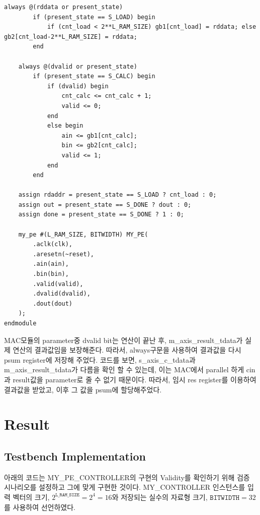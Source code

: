 \documentclass{article}
\newcommand{\orange}[1]{{\color{orange} #1}}
\begin{document}
\begin{lstlisting}[style={verilog-style}]
    always @(rddata or present_state)
        if (present_state == S_LOAD) begin
            if (cnt_load < 2**L_RAM_SIZE) gb1[cnt_load] = rddata; else gb2[cnt_load-2**L_RAM_SIZE] = rddata;
        end
    
    always @(dvalid or present_state)
        if (present_state == S_CALC) begin
            if (dvalid) begin
                cnt_calc <= cnt_calc + 1;
                valid <= 0;
            end
            else begin
                ain <= gb1[cnt_calc];
                bin <= gb2[cnt_calc];
                valid <= 1;
            end
        end
    
    assign rdaddr = present_state == S_LOAD ? cnt_load : 0;
    assign out = present_state == S_DONE ? dout : 0;
    assign done = present_state == S_DONE ? 1 : 0;
    
    my_pe #(L_RAM_SIZE, BITWIDTH) MY_PE(
        .aclk(clk),
        .aresetn(~reset),
        .ain(ain),
        .bin(bin),
        .valid(valid),
        .dvalid(dvalid),
        .dout(dout)
    );
endmodule
\end{lstlisting}

\orange{
MAC모듈의 parameter중 dvalid bit는 연산이 끝난 후, m\_axis\_result\_tdata가 실제 연산의 결과값임을 보장해준다. 따라서, always구문을 사용하여 결과값을 다시 psum register에 저장해 주었다. 코드를 보면, s\_axis\_c\_tdata과 m\_axis\_result\_tdata가 다름을 확인 할 수 있는데, 이는 MAC에서 parallel 하게 cin과 result값을 parameter로 줄 수 없기 때문이다. 따라서, 임시 res register를 이용하여 결과값을 받았고, 이후 그 값을 psum에 할당해주었다.
}

\newpage
\section{Result}

\subsection{Testbench Implementation}
\label{sec:testbench}
아래의 코드는 MY\_PE\_CONTROLLER의 구현의 Validity를 확인하기 위해 검증 시나리오를 설정하고 그에 맞게 구현한 것이다. MY\_CONTROLLER 인스턴스를 입력 벡터의 크기, $2^\texttt{L\_RAM\_SIZE}= 2^4=16$와 저장되는 실수의 자료형 크기, $\texttt{BITWIDTH}=32$를 사용하여 선언하였다.
\end{document}
